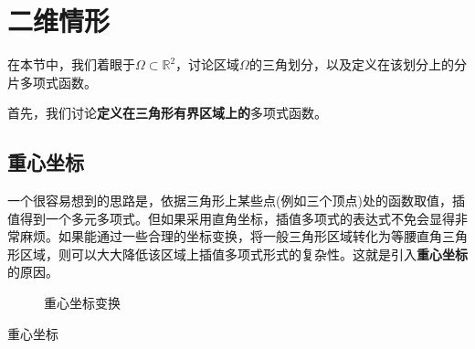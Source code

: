 \section{二维情形}
在本节中，我们着眼于$\Omega\subset\mathbb{R}^{2}$，讨论区域$\Omega$的三角划分，以及定义在该划分上的分片多项式函数。

首先，我们讨论\textbf{定义在三角形有界区域上的}多项式函数。
\subsection{重心坐标}
一个很容易想到的思路是，依据三角形上某些点(例如三个顶点)处的函数取值，插值得到一个多元多项式。但如果采用直角坐标，插值多项式的表达式不免会显得非常麻烦。如果能通过一些合理的坐标变换，将一般三角形区域转化为等腰直角三角形区域，则可以大大降低该区域上插值多项式形式的复杂性。这就是引入\textbf{重心坐标}的原因。
\begin{figure}[H]
    \caption{重心坐标变换}
        \centering
\end{figure}
\begin{definition}{重心坐标}
    
\end{definition}